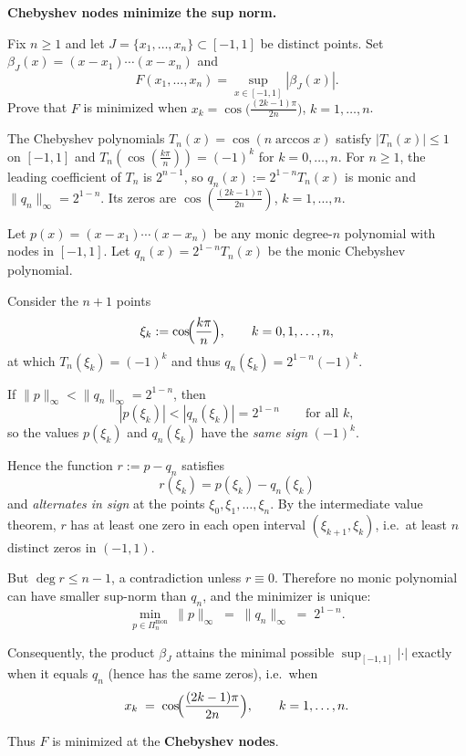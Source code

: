 \begin{problem}[CP-II-0359]
\label{prob:cp-ii-0359}
\textbf{Chebyshev nodes minimize the sup norm.}

\hspace*{1.5em}Fix $n\ge1$ and let $J=\{x_1,\dots,x_n\}\subset[-1,1]$ be distinct points.
Set $\beta_J(x)=(x-x_1)\cdots(x-x_n)$ and
\[
F(x_1,\dots,x_n)=\sup_{x\in[-1,1]}|\beta_J(x)|.
\]
Prove that $F$ is minimized when $x_k=\cos\!\bigl(\tfrac{(2k-1)\pi}{2n}\bigr)$, $k=1,\dots,n$.

\bigskip

The Chebyshev polynomials $T_n(x)=\cos(n\arccos x)$ satisfy $|T_n(x)|\le1$ on $[-1,1]$ and
$T_n(\cos(\frac{k\pi}{n}))=(-1)^k$ for $k=0,\dots,n$. For $n\ge1$, the leading coefficient of $T_n$ is $2^{n-1}$,
so $q_n(x):=2^{1-n}T_n(x)$ is monic and $\|q_n\|_\infty=2^{1-n}$. Its zeros are
$\cos(\frac{(2k-1)\pi}{2n})$, $k=1,\dots,n$.

\bigskip
\end{problem}

\begin{solution}
Let $p(x)=(x-x_1)\cdots(x-x_n)$ be any monic degree-$n$ polynomial with nodes in $[-1,1]$.
Let $q_n(x)=2^{1-n}T_n(x)$ be the monic Chebyshev polynomial.

\smallskip

Consider the $n+1$ points
\[
\xi_k:=\cos\!\Bigl(\frac{k\pi}{n}\Bigr),\qquad k=0,1,\dots,n,
\]
at which $T_n(\xi_k)=(-1)^k$ and thus $q_n(\xi_k)=2^{1-n}(-1)^k$.

\smallskip

If $\|p\|_\infty<\|q_n\|_\infty=2^{1-n}$, then
\[
|p(\xi_k)|<|q_n(\xi_k)|=2^{1-n}\qquad\text{for all }k,
\]
so the values $p(\xi_k)$ and $q_n(\xi_k)$ have the \emph{same sign} $(-1)^k$.

\smallskip

Hence the function $r:=p-q_n$ satisfies
\[
r(\xi_k)=p(\xi_k)-q_n(\xi_k)
\]
and \emph{alternates in sign} at the points $\xi_0,\xi_1,\dots,\xi_n$.
By the intermediate value theorem, $r$ has at least one zero in each open interval
$(\xi_{k+1},\xi_k)$, i.e.\ at least $n$ distinct zeros in $(-1,1)$.

\smallskip

But $\deg r\le n-1$, a contradiction unless $r\equiv 0$.
Therefore no monic polynomial can have smaller sup-norm than $q_n$, and the minimizer is unique:
\[
\min_{p\in\Pi_n^{\mathrm{mon}}}\ \|p\|_\infty \;=\; \|q_n\|_\infty \;=\; 2^{1-n}.
\]

\smallskip

Consequently, the product $\beta_J$ attains the minimal possible
$\sup_{[-1,1]}|\cdot|$ exactly when it equals $q_n$ (hence has the same zeros), i.e.\ when
\[
x_k \;=\; \cos\!\Bigl(\frac{(2k-1)\pi}{2n}\Bigr),
\qquad k=1,\dots,n.
\]

Thus $F$ is minimized at the \textbf{Chebyshev nodes}.

\smallskip
\end{solution}

